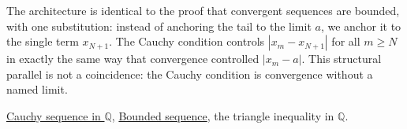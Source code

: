 \begin{remark*}
The architecture is identical to the proof that convergent sequences are bounded,
with one substitution: instead of anchoring the tail to the limit $a$, we anchor
it to the single term $x_{N+1}$.  The Cauchy condition controls
$|x_m - x_{N+1}|$ for all $m \geq N$ in exactly the same way that convergence
controlled $|x_m - a|$.  This structural parallel is not a coincidence: the
Cauchy condition is convergence without a named limit.
\end{remark*}

\begin{dependencies}
\hyperref[def:cauchy-rational]{Cauchy sequence in $\mathbb{Q}$},
\hyperref[def:bounded-sequence-q]{Bounded sequence},
the triangle inequality in $\mathbb{Q}$.
\end{dependencies}

\clearpage
